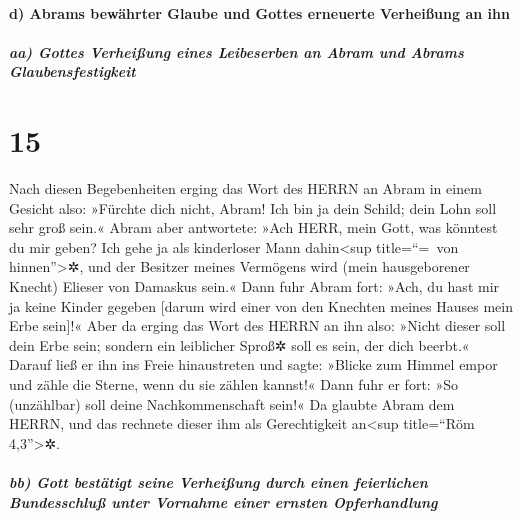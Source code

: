 \hypertarget{d-abrams-bewuxe4hrter-glaube-und-gottes-erneuerte-verheiuxdfung-an-ihn}{%
\paragraph{d) Abrams bewährter Glaube und Gottes erneuerte Verheißung an
ihn}\label{d-abrams-bewuxe4hrter-glaube-und-gottes-erneuerte-verheiuxdfung-an-ihn}}

\hypertarget{aa-gottes-verheiuxdfung-eines-leibeserben-an-abram-und-abrams-glaubensfestigkeit}{%
\subparagraph{aa) Gottes Verheißung eines Leibeserben an Abram und
Abrams
Glaubensfestigkeit}\label{aa-gottes-verheiuxdfung-eines-leibeserben-an-abram-und-abrams-glaubensfestigkeit}}

\hypertarget{section-14}{%
\section{15}\label{section-14}}

 Nach diesen Begebenheiten erging das Wort des HERRN an
Abram in einem Gesicht also: »Fürchte dich nicht, Abram! Ich bin ja dein
Schild; dein Lohn soll sehr groß sein.«  Abram aber
antwortete: »Ach HERR, mein Gott, was könntest du mir geben? Ich gehe ja
als kinderloser Mann dahin\textless sup title=``=~von
hinnen''\textgreater✲, und der Besitzer meines Vermögens wird (mein
hausgeborener Knecht) Elieser von Damaskus sein.«  Dann
fuhr Abram fort: »Ach, du hast mir ja keine Kinder gegeben {[}darum wird
einer von den Knechten meines Hauses mein Erbe sein{]}!« 
Aber da erging das Wort des HERRN an ihn also: »Nicht dieser soll dein
Erbe sein; sondern ein leiblicher Sproß✲ soll es sein, der dich beerbt.«
 Darauf ließ er ihn ins Freie hinaustreten und sagte:
»Blicke zum Himmel empor und zähle die Sterne, wenn du sie zählen
kannst!« Dann fuhr er fort: »So (unzählbar) soll deine Nachkommenschaft
sein!«  Da glaubte Abram dem HERRN, und das rechnete
dieser ihm als Gerechtigkeit an\textless sup title=``Röm
4,3''\textgreater✲.

\hypertarget{bb-gott-bestuxe4tigt-seine-verheiuxdfung-durch-einen-feierlichen-bundesschluuxdf-unter-vornahme-einer-ernsten-opferhandlung}{%
\subparagraph{bb) Gott bestätigt seine Verheißung durch einen
feierlichen Bundesschluß unter Vornahme einer ernsten
Opferhandlung}\label{bb-gott-bestuxe4tigt-seine-verheiuxdfung-durch-einen-feierlichen-bundesschluuxdf-unter-vornahme-einer-ernsten-opferhandlung}}

